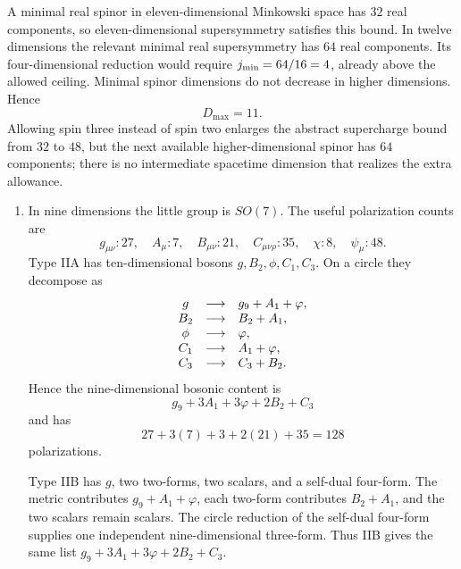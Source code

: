 \begin{enumerate}
  A minimal real spinor in eleven-dimensional Minkowski space has
  \(32\) real components, so eleven-dimensional supersymmetry satisfies
  this bound.  In twelve dimensions the relevant minimal real
  supersymmetry has \(64\) real components.  Its four-dimensional
  reduction would require
  \(j_{\rm min}=64/16=4\), already above the allowed ceiling.  Minimal
  spinor dimensions do not decrease in higher dimensions.  Hence
  \[
    \boxed{D_{\max}=11}.
  \]
  Allowing spin three instead of spin two enlarges the abstract
  supercharge bound from \(32\) to \(48\), but the next available
  higher-dimensional spinor has \(64\) components; there is no
  intermediate spacetime dimension that realizes the extra allowance.

  \begin{enumerate}
    \item In nine dimensions the little group is \(SO(7)\).  The useful
      polarization counts are
      \[
        g_{\mu\nu}:27,\quad A_\mu:7,\quad
        B_{\mu\nu}:21,\quad C_{\mu\nu\rho}:35,\quad
        \chi:8,\quad \psi_\mu:48.
      \]
      Type IIA has ten-dimensional bosons
      \(g,B_2,\phi,C_1,C_3\).  On a circle they decompose as
      \[
      \begin{array}{c@{\quad\longrightarrow\quad}l}
        g&g_9+A_1+\varphi,\\
        B_2&B_2+A_1,\\
        \phi&\varphi,\\
        C_1&A_1+\varphi,\\
        C_3&C_3+B_2.
      \end{array}
      \]
      Hence the nine-dimensional bosonic content is
      \[
        g_9+3A_1+3\varphi+2B_2+C_3
      \]
      and has
      \[
        27+3(7)+3+2(21)+35=128
      \]
      polarizations.

      Type IIB has \(g\), two two-forms, two scalars, and a self-dual
      four-form.  The metric contributes \(g_9+A_1+\varphi\), each
      two-form contributes \(B_2+A_1\), and the two scalars remain
      scalars.  The circle reduction of the self-dual four-form supplies
      one independent nine-dimensional three-form.  Thus IIB gives the
      same list
      \(g_9+3A_1+3\varphi+2B_2+C_3\).


\end{enumerate}
\end{enumerate}
